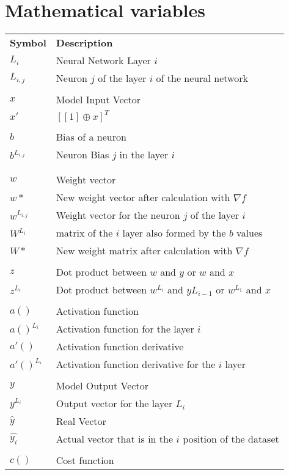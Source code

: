 \section{Mathematical variables}
\begin{tabular}{@{}ll@{}} 
\textbf{Symbol} & \textbf{Description} \\
$L_i$ & Neural Network Layer $i$\\
$L_{i,j}$ & Neuron $j$ of the layer $i$ of the neural network\\
\\
$x$ & Model Input Vector \\
$x'$ & $[[1] \oplus x]^T$ \\
\\
$b$ & Bias of a neuron \\
$b^{L_{i, j}}$ & Neuron Bias $j$ in the layer $i$ \\
\\\\
$w$ & Weight vector \\
$w*$ & New weight vector after calculation with $\nabla f$\\
$w^{L_{i, j}}$ & Weight vector for the neuron $j$ of the layer $i$ \\
$W^{L_{i}}$ &  matrix of the $i$ layer also formed by the $b$ values \\
$W*$ & New weight matrix after calculation with  $\nabla f$\\
\\
$z$ & Dot product between $w$ and $y$ or $w$ and $x$\\
$z^{L_i}$ & Dot product between $w^{L_i}$ and $y{L_{i-1}}$ or $w^{L_1}$ and $x$\\
\\
$a()$ & Activation function\\
$a()^{L_i}$ & Activation function for the layer $i$\\
$a'()$ & Activation function derivative\\
$a'()^{L_i}$ & Activation function derivative for the $i$ layer\\
\\
$y$ & Model Output Vector \\
$y^{L_i}$ & Output vector for the layer $L_i$ \\
$\hat{y}$ & Real Vector \\
$\hat{y_i}$ & Actual vector that is in the $i$ position of the dataset \\
\\
$c()$ & Cost function \\

\end{tabular}
